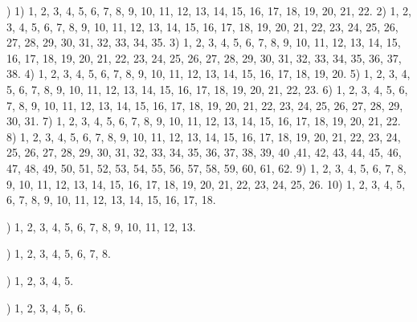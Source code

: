 \documentclass[a4paper,11pt]{article}
\begin{document}
\noindent
{}) 1) 1, 2, 3, 4, 5, 6, 7, 8, 9, 10, 11, 12, 13, 14, 15,
16, 17, 18, 19, 20, 21, 22. 2) 1, 2, 3, 4, 5, 6, 7, 8, 9, 10, 11, 12,
13, 14, 15, 16, 17, 18, 19, 20, 21, 22, 23, 24, 25, 26, 27, 28, 29,
30, 31, 32, 33, 34, 35. 3) 1, 2, 3, 4, 5, 6, 7, 8, 9, 10, 11, 12, 13,
14, 15, 16, 17, 18, 19, 20, 21, 22, 23, 24, 25, 26, 27, 28, 29, 30, 31,
32, 33, 34, 35, 36, 37, 38. 4) 1, 2, 3, 4, 5, 6, 7, 8, 9, 10, 11, 12,
13, 14, 15, 16, 17, 18, 19, 20. 5) 1, 2, 3, 4, 5, 6, 7, 8, 9, 10, 11,
12, 13, 14, 15, 16, 17, 18, 19, 20, 21, 22, 23. 6) 1, 2, 3, 4, 5, 6, 7,
8, 9, 10, 11, 12, 13, 14, 15, 16, 17, 18, 19, 20, 21, 22, 23, 24, 25,
26, 27, 28, 29, 30, 31. 7) 1, 2, 3, 4, 5, 6, 7, 8, 9, 10, 11, 12, 13,
14, 15, 16, 17, 18, 19, 20, 21, 22. 8) 1, 2, 3, 4, 5, 6, 7, 8, 9, 10,
11, 12, 13, 14, 15, 16, 17, 18, 19, 20, 21, 22, 23, 24, 25, 26, 27, 28,
29, 30, 31, 32, 33, 34, 35, 36, 37, 38, 39, 40 ,41, 42, 43, 44, 45, 46,
47, 48, 49, 50, 51, 52, 53, 54, 55, 56, 57, 58, 59, 60, 61, 62. 9) 1, 2,
3, 4, 5, 6, 7, 8, 9, 10, 11, 12, 13, 14, 15, 16, 17, 18, 19, 20, 21, 22,
23, 24, 25, 26. 10) 1, 2, 3, 4, 5, 6, 7, 8, 9, 10, 11, 12, 13, 14, 15,
16, 17, 18.


\vspace{\spaceTwo}












\noindent
{}) 1, 2, 3, 4, 5, 6, 7, 8, 9, 10, 11, 12, 13.

\vspace{\spaceFour}



\noindent
{}) 1, 2, 3, 4, 5, 6, 7, 8.

\vspace{\spaceFour}



\noindent
{}) 1, 2, 3, 4, 5.

\vspace{\spaceFour}



\noindent
{}) 1, 2, 3, 4, 5, 6.

\vspace{\spaceFour}
\end{document}

